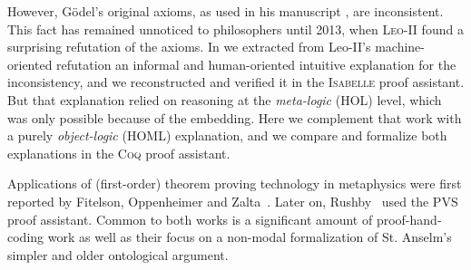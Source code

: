 \documentclass{llncs}
\begin{document}
However, G\"odel's original axioms, as used in his
manuscript \cite{GoedelNotes}, are inconsistent. This fact has
remained unnoticed to philosophers until 2013, 
when \textsc{Leo-II} \cite{J30} found a surprising refutation of the axioms.
In \cite{C55} we extracted from Leo-II's machine-oriented refutation an informal and human-oriented intuitive explanation for the inconsistency, and we reconstructed and
verified it in the \textsc{Isabelle} proof assistant. But that explanation relied on reasoning at the \emph{meta-logic} (HOL) level, which was only possible because of the embedding. Here we complement that work with a purely \emph{object-logic} (HOML) explanation, and we compare and formalize both explanations in the \textsc{Coq} proof assistant.

Applications of (first-order) theorem proving technology in
metaphysics were first reported by Fitelson, Oppenheimer and
Zalta~\cite{FitelsonZalta,oppenheimer11}. 
Later on, Rushby~\cite{rushby13} used the \textsc{PVS} proof
assistant. Common to both works is a
significant amount of proof-hand-coding work as well as their focus on
a non-modal formalization of St. Anselm's simpler
and older ontological argument.
\end{document}
